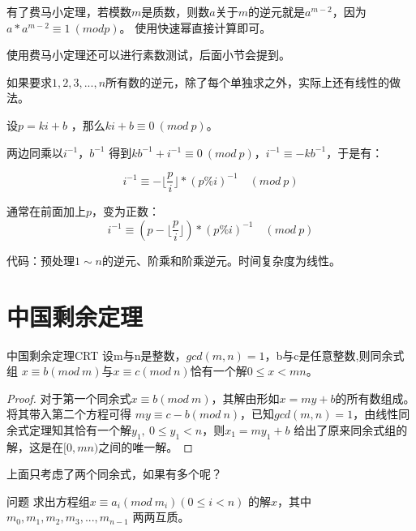 \vbox{}

有了费马小定理，若模数$m$是质数，则数$a$关于$m$的逆元就是$a^{m-2}$，因为$a* a^{m-2} \equiv 1 \ (mod p)$。
使用快速幂直接计算即可。

\vbox{}

{\heiti 使用费马小定理还可以进行素数测试}，后面小节会提到。

\vbox{}

\begin{note}
	如果要求$1,2,3,...,n$所有数的逆元，除了每个单独求之外，实际上还有线性的做法。
	
	设$p=ki+b$ ，那么$ki+b\equiv 0 \ (mod\  p)$。 
	
	两边同乘以$i^{-1}，b^{-1}$ 得到$kb^{-1}+i^{-1}\equiv 0 \  (mod\ p)$，$i^{-1}\equiv -kb^{-1}$，于是有：
	
	$$i^{-1}\equiv -\lfloor\frac{p}{i}\rfloor * (p\%i)^{-1} \quad (mod\ p)$$
	
	通常在前面加上$p$，变为正数：
	$$i^{-1}\equiv (p-\lfloor\frac{p}{i}\rfloor) * (p\%i)^{-1} \quad (mod\ p)$$
	
	代码：预处理$1\sim n$的逆元、阶乘和阶乘逆元。时间复杂度为线性。
	
\end{note}

\section{中国剩余定理}

\begin{theorem}{中国剩余定理}{CRT}
	设m与n是整数，$gcd(m,n)=1$，b与c是任意整数,则同余式组
	$x\equiv b(mod\ m)$与$x\equiv c(mod\ n)$恰有一个解$0\leqslant x<mn$。
\end{theorem}

\begin{proof}
	对于第一个同余式$x\equiv b(mod\ m)$，其解由形如$x = my +b$的所有数组成。将其带入第二个方程可得
	$my\equiv c-b (mod\ n)$，已知$gcd(m,n)=1$，由线性同余式定理知其恰有一个解$y_1,\ 0\le y_1<n$，则$x_1=my_1+b$
	给出了原来同余式组的解，这是在$[0,mn)$之间的唯一解。
\end{proof}

\vbox{}

上面只考虑了两个同余式，如果有多个呢？

\begin{custom}{问题}
	求出方程组$x\equiv a_i(mod \ m_i) (0 \leqslant i <n) $ 的解$x$，其中$m_0,m_1,m_2,m_3,...,m_{n-1}$ 两两互质。
\end{custom}

